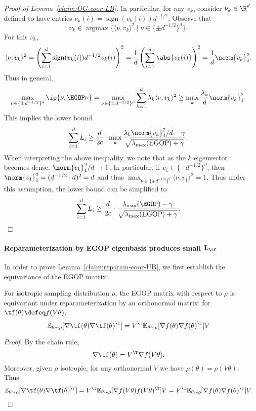 \begin{proof}[Proof of Lemma~\ref{claim:OG-coor-LB}]
    In particular, for any $v_k$, consider $\nu_k\in \R^d$ defined to have entries $\nu_k(i) = \operatorname{sign}(v_k(i))d^{-1/2}$. Observe that 
    \[
        \nu_k \in \operatorname{argmax}\{\langle \nu, v_k\rangle^2 \mid  \nu\in \{\pm d^{-1/2}\}^d \}.
    \]
    For this $\nu_k$,
    \[
        \langle \nu, v_k\rangle^2 = \left(\sum_{i=1}^d \operatorname{sign}(v_k(i))d^{-1/2} v_k(i)\right)^2 = \frac{1}{d}\left(\sum_{i=1}^d \abs{v_k(i)}\right)^2 = \frac{1}{d}\norm{v_k}^2_1.
    \]
    Thus in general,
    \[
        \max_{\nu\in \{\pm d^{-1/2}\}^d} \ip{\nu, \EGOP \nu} = \max_{\nu\in \{\pm d^{-1/2}\}^d} \sum_{k=1}^d \lambda_k \langle \nu, v_k\rangle^2 \geq \max_k \frac{\lambda_k}{d}\norm{v_k}^2_1.
    \]
    This implies the lower bound
    \[
        \sum_{i=1}^d L_i \geq \frac{d}{2c}\cdot \max_{k}\frac{\lambda_k \norm{v_k}^2_1/d - \gamma}{\sqrt{\lambda_{\max}(\operatorname{EGOP}) + \gamma}}.
    \]
    When interpreting the above inequality, we note that as the $k$ eigenvector becomes dense, $\norm{v_k}^2_1/d\rightarrow 1$. In particular, if $v_1 \in \{\pm d^{-1/2}\}^d$, then
    $
        \norm{v_1}^2_1 = (d^{-1/2}\cdot d)^2 = d
    $
    and thus
    $
        \max_{\nu\in \{\pm d^{-1/2}\}^d} \langle \nu, v_1\rangle^2 = 1.
    $ Thus under this assumption, the lower bound can be simplified to
    \[
        \sum_{i=1}^d L_i \geq \frac{d}{2c}\cdot \frac{\lambda_{\max}(\EGOP) - \gamma}{\sqrt{\lambda_{\max}(\operatorname{EGOP}) + \gamma}}.
    \]
\end{proof}

\paragraph{Reparameterization by EGOP eigenbasis produces small $\mathbf{L_{\tf}}$} In order to prove Lemma~\ref{claim:reparam-coor-UB}, we first establish the equivariance of the EGOP matrix: 
\begin{lemma}\label{lemma:equivariant-EGOP}
    For isotropic sampling distribution $\rho$, the EGOP matrix with respect to $\rho$ is equivariant under reparameterization by an orthonormal matrix: for $\tf(\theta)\defeq f(V\theta)$, 
    \[
        \mathbb{E}_{\theta\sim \rho}[\nabla \tf(\theta)\nabla \tf(\theta)^\T] = V^\T \mathbb{E}_{\theta\sim \rho}[\nabla f(\theta)\nabla f(\theta)^\T] V
    \]
\end{lemma}
\begin{proof}
    By the chain rule,
    \[
        \nabla \tf(\theta) = V^\T \nabla f(V\theta).
    \]
    Moreover, given $\rho$ isotropic, for any orthonormal $V$ we have $\rho(\theta)=\rho(V\theta)$. Thus 
    \begin{align*}
        \mathbb{E}_{\theta\sim \rho}[\nabla \tf(\theta)\nabla \tf(\theta)^\T]=V^\T\mathbb{E}_{\theta\sim \rho}[\nabla f(V\theta)f(V\theta)^\T]V=V^\T \mathbb{E}_{\theta\sim \rho}[\nabla f(\theta)\nabla f(\theta)^\T]V.
    \end{align*}
\end{proof}

